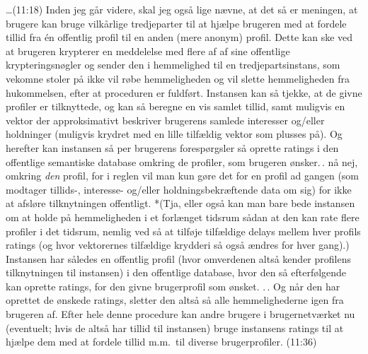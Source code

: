 \documentclass{report}
\begin{document}
\ldots (11:18) Inden jeg går videre, skal jeg også lige nævne, at det så er meningen, at brugere kan bruge vilkårlige tredjeparter til at hjælpe brugeren med at fordele tillid fra én offentlig profil til en anden (mere anonym) profil. Dette kan ske ved at brugeren krypterer en meddelelse med flere af af sine offentlige krypteringsnøgler og sender den i hemmelighed til en tredjepartsinstans, som vekomne stoler på ikke vil røbe hemmeligheden og vil slette hemmeligheden fra hukommelsen, efter at proceduren er fuldført. Instansen kan så tjekke, at de givne profiler er tilknyttede, og kan så beregne en vis samlet tillid, samt muligvis en vektor der approksimativt beskriver brugerens samlede interesser og/eller holdninger (muligvis krydret med en lille tilfældig vektor som plusses på). Og herefter kan instansen så per brugerens forespørgsler så oprette ratings i den offentlige semantiske database omkring de profiler, som brugeren ønsker.\,. nå nej, omkring \emph{den} profil, for i reglen vil man kun gøre det for en profil ad gangen (som modtager tillids-, interesse- og/eller holdningsbekræftende data om sig) for ikke at afsløre tilknytningen offentligt. *(Tja, eller også kan man bare bede instansen om at holde på hemmeligheden i et forlænget tidsrum sådan at den kan rate flere profiler i det tidsrum, nemlig ved så at tilføje tilfældige delays mellem hver profils ratings (og hvor vektorernes tilfældige krydderi så også ændres for hver gang).) Instansen har således en offentlig profil (hvor omverdenen altså kender profilens tilknytningen til instansen) i den offentlige database, hvor den så efterfølgende kan oprette ratings, for den givne brugerprofil som ønsket. .\,. Og når den har oprettet de ønskede ratings, sletter den altså så alle hemmelighederne igen fra brugeren af. Efter hele denne procedure kan andre brugere i brugernetværket nu (eventuelt; hvis de altså har tillid til instansen) bruge instansens ratings til at hjælpe dem med at fordele tillid m.m.\ til diverse brugerprofiler. (11:36)
\end{document}
